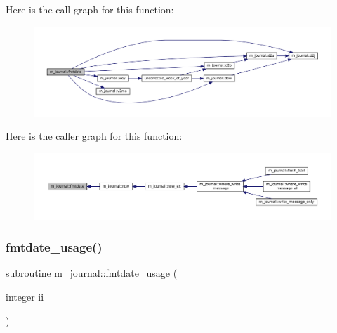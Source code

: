 Here is the call graph for this function\+:\nopagebreak
\begin{figure}[H]
\begin{center}
\leavevmode
\includegraphics[width=350pt]{namespacem__journal_a626580cd351557ac2d107fd2a97a388f_cgraph}
\end{center}
\end{figure}
Here is the caller graph for this function\+:\nopagebreak
\begin{figure}[H]
\begin{center}
\leavevmode
\includegraphics[width=350pt]{namespacem__journal_a626580cd351557ac2d107fd2a97a388f_icgraph}
\end{center}
\end{figure}
\mbox{\label{namespacem__journal_aad40dcd3091bc958ddd427db862e28b5}} 
\subsubsection{\texorpdfstring{fmtdate\+\_\+usage()}{fmtdate\_usage()}}
{\footnotesize\ttfamily subroutine m\+\_\+journal\+::fmtdate\+\_\+usage (\begin{DoxyParamCaption}\item[{integer}]{ii }\end{DoxyParamCaption})\hspace{0.3cm}{\ttfamily [private]}}

\mbox{\label{namespacem__journal_a3856fe36ea3b9de491627294a1488918}} 
